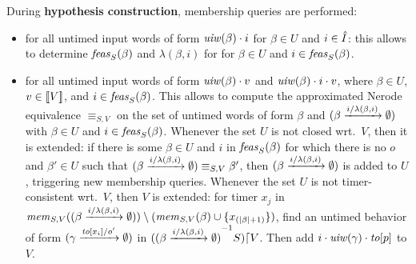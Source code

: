 During {\bf hypothesis construction}, membership queries are performed:
\begin{itemize}
\item for all untimed input words of form $\untimedinputword(\beta) \cdot i$
   for $\beta \in U$ and $i \in \extinputs$: this allows to determine
   $\feasibleinputs{\beta}{S}$ and $\lambda(\beta,i)$ for
   for $\beta \in U$ and $i \in \feasibleinputs{\beta}{S}$.
\item
  for all untimed input words of form $\untimedinputword(\beta) \cdot v$ and
  $\untimedinputword(\beta) \cdot i \cdot v$, where
  $\beta \in U$, $v \in \instancesof{V}$, and
  $i \in \feasibleinputs{\beta}{S}$.
    This allows to compute the approximated Nerode equivalence $\equiv_{S,V}$ on
    the set of untimed words of form $\beta$ and
    $\extend{\beta}{i}{\lambda(\beta,i)}$ with
    $\beta \in U$ and $i \in \feasibleinputs{\beta}{S}$.
    Whenever the set $U$ is not closed wrt.\ $V$, then it is extended:
if there is some $\beta \in U$ and $i$ in $\feasibleinputs{\beta}{S}$
for which there is no $o$ and $\beta' \in U$ such that
$\extend{\beta}{i}{\lambda(\beta,i)} \equiv_{S,V} \beta'$, 
then $\extend{\beta}{i}{\lambda(\beta,i)}$ is added to $U$,
triggering new membership queries.
Whenever the set $U$ is not timer-consistent wrt.\ $V$, then $V$ is extended:
for timer $x_j$ in
$\apprgetmemorable{S}{\extend{\beta}{i}{\lambda(\beta,i)}}{V} \setminus (\apprgetmemorable{S}{\beta}{V} \cup \set{x_{(|\beta|+1)}})$, find an 
untimed behavior of form $\extend{\gamma}{\toevent{x_i}}{o'}$ in
$\apprsuffixbehs{S}{\extend{\beta}{i}{\lambda(\beta,i)}}{V}$.
Then add $i\cdot\untimedinputword(\gamma)\cdot\toevent{p}$ to $V$.
\end{itemize}

